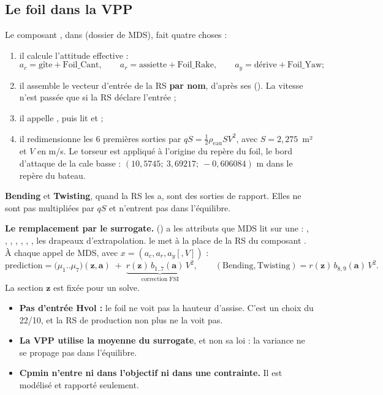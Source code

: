 \documentclass[10pt,a4paper]{article}
\newcommand{\vz}{\bm{z}}
\newcommand{\va}{\bm{a}}
\begin{document}
\subsection{Le foil dans la VPP}
\label{sec:foilvpp}
Le composant , dans  (dossier
 de MDS), fait quatre choses :
\begin{enumerate}
  \item il calcule l'attitude effective :
        \[ a_c = \text{gîte}+\text{Foil\_Cant},\qquad a_r=\text{assiette}+\text{Foil\_Rake},\qquad
           a_y=\text{dérive}+\text{Foil\_Yaw} ; \]
  \item il assemble le vecteur d'entrée de la RS \textbf{par nom}, d'après ses 
        (). La vitesse n'est passée que si la RS déclare l'entrée  ;
  \item il appelle , puis lit  et  ;
  \item il redimensionne les 6 premières sorties par $q S=\tfrac12\rho_{\text{eau}} S V^2$, avec
        $S=2{,}275$~m² et $V$ en m/s. Le torseur est appliqué à l'origine du repère du foil, le bord d'attaque
        de la cale basse : $(10{,}5745;\ 3{,}69217;\ -0{,}606084)$ m dans le repère du bateau.
\end{enumerate}

\textbf{Bending} et \textbf{Twisting}, quand la RS les a, sont des sorties de rapport. Elles ne sont pas
multipliées par $qS$ et n'entrent pas dans l'équilibre.

\textbf{Le remplacement par le surrogate.}  () a les attributs
que MDS lit sur une  : , , , ,
, , , les drapeaux d'extrapolation.  le met à la
place de la RS du composant . À chaque appel de MDS, avec $x=(a_c,a_r,a_y[,V])$ :
\[
  \text{prediction} = \big(\mu_1..\mu_7\big)(\vz,\va)
  \;+\; \underbrace{r(\vz)\, b_{1..7}(\va)\, V^2}_{\text{correction FSI}},\qquad
  (\text{Bending},\text{Twisting}) = r(\vz)\, b_{8,9}(\va)\, V^2 .
\]
La section $\vz$ est fixée pour un solve.

\begin{nonfait}
\begin{itemize}
  \item \textbf{Pas d'entrée Hvol :} le foil ne voit pas la hauteur d'assise. C'est un choix du 22/10, et la
        RS de production non plus ne la voit pas.
  \item \textbf{La VPP utilise la moyenne du surrogate}, et non sa loi : la variance ne se propage pas dans
        l'équilibre.
  \item \textbf{Cpmin n'entre ni dans l'objectif ni dans une contrainte.} Il est modélisé et rapporté seulement.
\end{itemize}
\end{nonfait}
\end{document}
